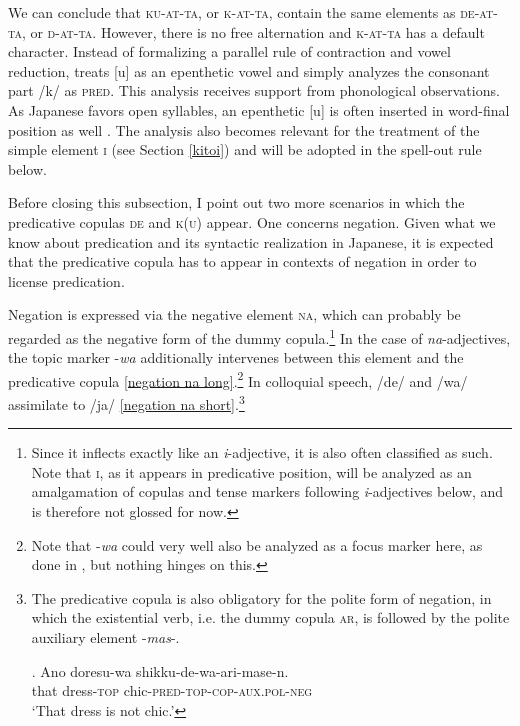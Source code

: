 \largerpage
We can conclude that \textsc{ku-at-ta}, or \textsc{k-at-ta}, contain the same elements as \textsc{de-at-ta}, or \textsc{d-at-ta}. However, there is no free alternation and \textsc{k-at-ta} has a default character. Instead of formalizing a parallel rule of contraction and vowel reduction, \citet[192–193]{nishiyama:1999:adj} treats [u] as an epenthetic vowel and simply analyzes the consonant part /k/ as \textsc{pred}. This analysis receives support from phonological observations. As Japanese favors open syllables, an epenthetic [u] is often inserted in word-final position as well \citep{kubozono:2005:rendaku, ito:2015:word}. The analysis also becomes relevant for the treatment of the simple element \textsc{i} (see Section \ref{kitoi}) and will be adopted in the spell-out rule below.

Before closing this subsection, I point out two more scenarios in which the predicative copulas \textsc{de} and \textsc{k(u)} appear. One concerns negation. Given what we know about predication and its syntactic realization in Japanese, it is expected that the predicative copula has to appear in contexts of negation in order to license predication.

Negation is expressed via the negative element \textsc{na}, which can probably be regarded as the negative form of the dummy copula.\footnote{Since it inflects exactly like an \textit{i}-adjective, it is also often classified as such. Note that \textsc{i}, as it appears in predicative position, will be analyzed as an amalgamation of copulas and tense markers following \textit{i}-adjectives below, and is therefore not glossed for now.} In the case of \textit{na}-adjectives, the topic marker -\textit{wa} additionally intervenes between this element and the predicative copula  \ref{negation na long}.\footnote{Note that -\textit{wa} could very well also be analyzed as a focus marker here, as done in \citet[6]{yamada:2023:looking}, but nothing hinges on this.} In colloquial speech, /de/ and /wa/ assimilate to /ja/ \ref{negation na short}.\footnote{The predicative copula is also obligatory for the polite form of negation, in which the existential verb, i.e. the dummy copula \textsc{ar}, is followed by the polite auxiliary element -\textit{mas}-. 

\par

\exg. Ano doresu-wa shikku-de-wa-ari-mase-n.\\
that dress-\textsc{top} chic-\textsc{pred-top-cop-aux.pol-neg}\\
`That dress is not chic.'

\par

}

